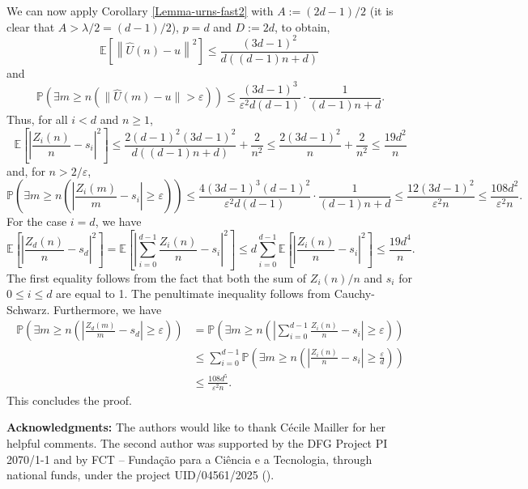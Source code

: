 \documentclass[12pt]{amsart}
\theoremstyle{definition}
\theoremstyle{remark}
\newcommand{\PP}{\mathbb{P}}
\newcommand{\EE}{\mathbb{E}}
\newcommand{\eps}{\varepsilon}
\begin{document}
We can now apply Corollary \ref{Lemma-urns-fast2} with $A:=(2d-1)/2$ (it is clear that $A> \lambda/2 =(d-1)/2$), $p=d$ and $D:=2d$, to obtain, 
\[
\EE\left[ \left\| \hat{U}(n)-u\right\|^2 \right]\leq \frac{(3d-1)^2}{d((d-1)n+d)}\ 
\]
and 
\[
\PP \left( \exists m\geq n \left( \|\hat{U}(m)-u\|>\eps\right)\right) \leq \frac{(3d-1)^3}{\eps^2d(d-1)}\cdot\frac{1}{(d-1)n+d}  .
\]
Thus, for all $i<d$ and $n\geq 1$,
\[
\EE\left[ \left| \frac{Z_i(n)}{n} - s_i\right|^2 \right]\leq \frac{2(d-1)^2(3d-1)^2}{d((d-1)n+d)} + \frac{2}{n^2}\leq \frac{2(3d-1)^2}{n}+ \frac{2}{n^2}\le \frac{19d^2}{n}
\]
and, for $n>2/\eps$,
\[
\PP\left( \exists m\geq  n \left( \left|\frac{Z_i(m)}{m} - s_i\right|\geq \eps \right) \right)\leq \frac{4(3d-1)^3(d-1)^2}{\eps^2d(d-1)}\cdot\frac{1}{(d-1)n+d}\le \frac{12(3d-1)^2}{\eps^2n}\le  \frac{108d^2}{\eps^2n}.
\]
For the case $i = d$, we have
\[
\EE\left[ \left| \frac{Z_d(n)}{n} - s_d\right|^2 \right]= \EE\left[ \left| \sum_{i=0}^{d-1}\frac{Z_i(n)}{n} - s_i\right|^2 \right]\le d \sum_{i=0}^{d-1}\EE\left[ \left| \frac{Z_i(n)}{n} - s_i\right|^2 \right] \le \frac{19d^4}{n}.
\]
The first equality follows from the fact that both the sum of $Z_i(n)/n$ and $s_i$ for $0\le i\le d$ are equal to 1. The penultimate inequality follows from Cauchy-Schwarz. Furthermore, we have
\begin{align*}
    \PP\left( \exists m\geq  n \left( \left|\frac{Z_d(m)}{m} - s_d\right|\geq \eps \right) \right) &=\PP\left( \exists m\geq  n \left( \left|\sum_{i=0}^{d-1}\frac{Z_i(n)}{n} - s_i\right|\geq \eps \right) \right)\\
    &\le \sum_{i=0}^{d-1}\PP\left( \exists m\geq  n \left( \left|\frac{Z_i(n)}{n} - s_i\right|\geq \frac{\eps}{d} \right) \right)\\
    &\le  \frac{108d^5}{\eps^2n}.
\end{align*}
This concludes the proof.

\noindent
{\bf Acknowledgments:} The authors would like to thank C\'ecile Mailler for her helpful comments. The second author was supported
by the DFG Project PI 2070/1-1 and by FCT -- Fundação para a Ciência e a Tecnologia, through national funds, under the project UID/04561/2025 ().



\end{document}
